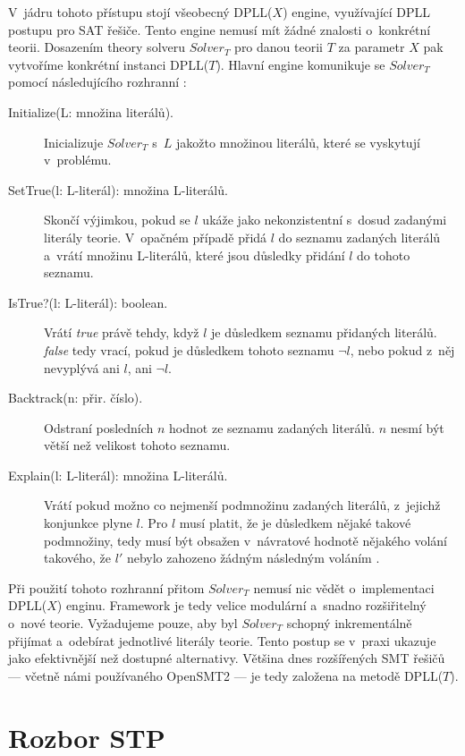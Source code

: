 V~jádru tohoto přístupu stojí všeobecný DPLL($X$) engine, využívající DPLL \cite{Davis60} postupu pro SAT řešiče. Tento engine nemusí mít žádné znalosti o~konkrétní teorii. Dosazením theory solveru $Solver_T$ pro danou teorii $T$ za parametr $X$ pak vytvoříme konkrétní instanci DPLL($T$). Hlavní engine komunikuje se $Solver_T$ pomocí následujícího rozhranní \cite{Gazinger04}:

\begin{description}
	\item[Initialize(L: množina literálů).] Inicializuje $Solver_T$ s~$L$ jakožto množinou literálů, které se vyskytují v~problému.
	\item[SetTrue(l: L-literál): množina L-literálů.] Skončí výjimkou, pokud se $l$ ukáže jako nekonzistentní s~dosud zadanými literály teorie. V~opačném případě přidá $l$ do seznamu zadaných literálů a~vrátí množinu L-literálů, které jsou důsledky přidání $l$ do tohoto seznamu.
	\item[IsTrue?(l: L-literál): boolean.] Vrátí \emph{true} právě tehdy, když $l$ je důsledkem seznamu přidaných literálů. \emph{false} tedy vrací, pokud je důsledkem tohoto seznamu $\neg l$, nebo pokud z~něj nevyplývá ani $l$, ani $\neg l$.
	\item[Backtrack(n: přir. číslo).] Odstraní posledních $n$ hodnot ze seznamu zadaných literálů. $n$ nesmí být větší než velikost tohoto seznamu.
	\item[Explain(l: L-literál): množina L-literálů.] Vrátí pokud možno co nejmenší podmnožinu zadaných literálů, z~jejichž konjunkce plyne $l$. Pro $l$ musí platit, že je důsledkem nějaké takové podmnožiny, tedy musí být obsažen v~návratové hodnotě nějakého volání  takového, že $l'$ nebylo zahozeno žádným následným voláním .
\end{description}

Při použití tohoto rozhranní přitom $Solver_T$ nemusí nic vědět o~implementaci DPLL($X$) enginu. Framework je tedy velice modulární a~snadno rozšiřitelný o~nové teorie. Vyžadujeme pouze, aby byl $Solver_T$ schopný inkrementálně přijímat a~odebírat jednotlivé literály teorie. Tento postup se v~praxi ukazuje jako efektivnější než dostupné alternativy. Většina dnes rozšířených SMT řešičů --- včetně námi používaného OpenSMT2 --- je tedy založena na metodě DPLL($T$).

\section{Rozbor STP}\label{stp}

